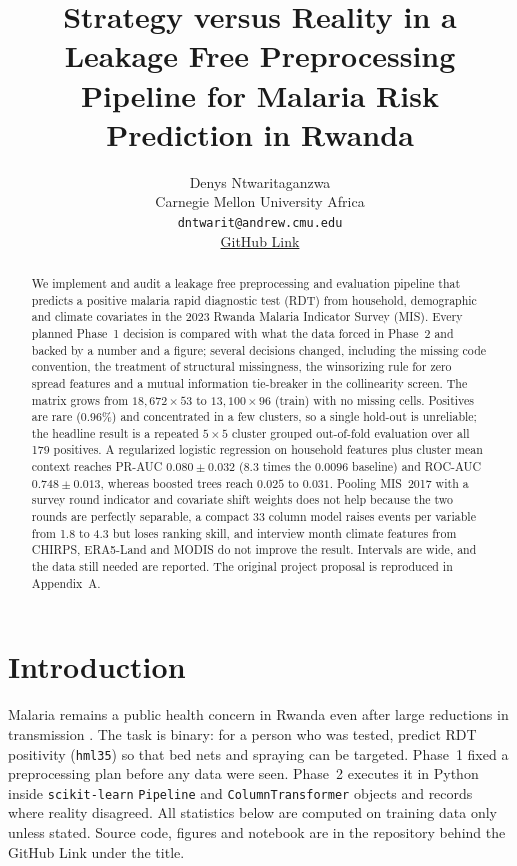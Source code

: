 \documentclass[11pt]{article}
\title{Strategy versus Reality in a Leakage Free Preprocessing Pipeline for Malaria Risk Prediction in Rwanda}
\author{Denys Ntwaritaganzwa \\
  Carnegie Mellon University Africa \\
  \texttt{dntwarit@andrew.cmu.edu} \\
  \href{https://github.com/dntwaritag/malaria-risk-prediction-rwanda}{GitHub Link}}
\begin{document}
\maketitle
\begin{abstract}
We implement and audit a leakage free preprocessing and evaluation pipeline that predicts a positive malaria rapid diagnostic test (RDT) from household, demographic and climate covariates in the 2023 Rwanda Malaria Indicator Survey (MIS). Every planned Phase~1 decision is compared with what the data forced in Phase~2 and backed by a number and a figure; several decisions changed, including the missing code convention, the treatment of structural missingness, the winsorizing rule for zero spread features and a mutual information tie-breaker in the collinearity screen. The matrix grows from $18{,}672\times53$ to $13{,}100\times96$ (train) with no missing cells. Positives are rare (0.96\%) and concentrated in a few clusters, so a single hold-out is unreliable; the headline result is a repeated $5\times5$ cluster grouped out-of-fold evaluation over all 179 positives. A regularized logistic regression on household features plus cluster mean context reaches PR-AUC $0.080\pm0.032$ (8.3 times the $0.0096$ baseline) and ROC-AUC $0.748\pm0.013$, whereas boosted trees reach $0.025$ to $0.031$. Pooling MIS~2017 with a survey round indicator and covariate shift weights does not help because the two rounds are perfectly separable, a compact 33 column model raises events per variable from 1.8 to 4.3 but loses ranking skill, and interview month climate features from CHIRPS, ERA5-Land and MODIS do not improve the result. Intervals are wide, and the data still needed are reported. The original project proposal is reproduced in Appendix~A.
\end{abstract}

\section{Introduction}
Malaria remains a public health concern in Rwanda even after large reductions in transmission \cite{habyarimana2020}. The task is binary: for a person who was tested, predict RDT positivity (\texttt{hml35}) so that bed nets and spraying can be targeted. Phase~1 fixed a preprocessing plan before any data were seen. Phase~2 executes it in Python inside \texttt{scikit-learn} \texttt{Pipeline} and \texttt{ColumnTransformer} objects \cite{pedregosa2011} and records where reality disagreed. All statistics below are computed on training data only unless stated. Source code, figures and notebook are in the repository behind the GitHub Link under the title.
\end{document}
